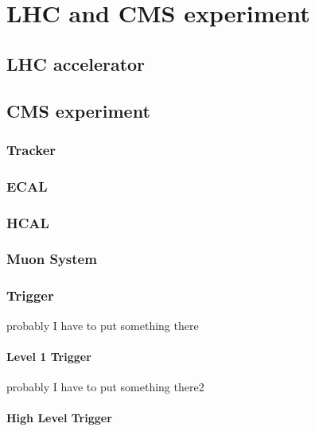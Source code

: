 %
%
%
%
%
%
%
%
%
%

%
%

\chapter{LHC and CMS experiment}
\label{chap:golfing}

\section{LHC accelerator}


\section{CMS experiment}

\subsection{Tracker}

\subsection{ECAL}

\subsection{HCAL}

\subsection{Muon System}

\subsection{Trigger}
probably I have to put something there


\subsubsection{Level 1 Trigger}
probably I have to put something there2



\subsubsection{High Level Trigger}

%
% 
% 

